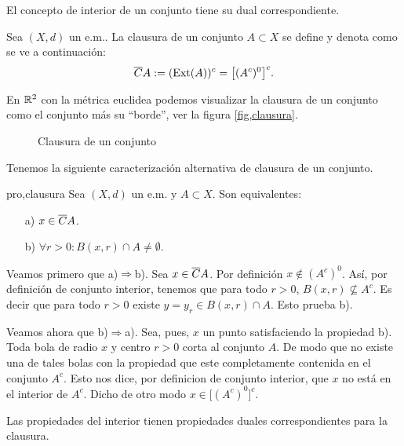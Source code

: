 El concepto de interior de un conjunto tiene su dual
correspondiente.
\begin{definicion}{} Sea $(X,d)$ un e.m.. La clausura de un conjunto $A\subset
X$ se define y denota como se ve a continuación:
\[\overline{C}{A}:=(\text{Ext}(A))^c=\bigl[(A^c)^0\bigr]^c.\]
\end{definicion}

 En $\mathbb{R}^2$ con la métrica euclidea podemos visualizar la
clausura de un conjunto  como el conjunto más su ``borde'', ver
la figura \vref{fig,clausura}.

\begin{figure}
\begin{center}
	\caption{Clausura de un conjunto}\label{fig,clausura}
\end{center}
\end{figure}

Tenemos la siguiente caracterización alternativa de clausura de
un conjunto.
\begin{proposicion}{pro,clausura} Sea $(X,d)$ un e.m. y $A\subset X$. Son
equivalentes:
\begin{itemize}
\item[a)] $x\in \overline{C}{A}$.
\item[b)] $\forall r>0: B(x,r)\cap A\neq\emptyset$.
\end{itemize}
\end{proposicion}
\begin{demo}Veamos primero que a)$\Rightarrow$b). Sea $x\in \overline{C}{A}$. Por
definición $x\notin (A^c)^0$. Así, por definición de
conjunto interior, tenemos que para todo $r>0$, $B(x,r)\nsubseteq
A^c$. Es decir que para todo $r>0$ existe $y=y_r\in B(x,r)\cap A$.
Esto prueba b).

Veamos ahora que b)$\Rightarrow$a). Sea, pues, $x$ un punto
satisfaciendo la propiedad b). Toda bola de radio $x$ y centro
$r>0$ corta al conjunto $A$. De modo que no existe una de tales
bolas con la propiedad que este completamente contenida en el
conjunto $A^c$. Esto nos dice, por definicion de conjunto
interior, que $x$ no está en el interior de $A^c$. Dicho de otro
modo $x\in \bigl[(A^c)^0\bigr]^c$.
\end{demo}

Las propiedades del interior tienen propiedades duales
correspondientes para la clausura.

